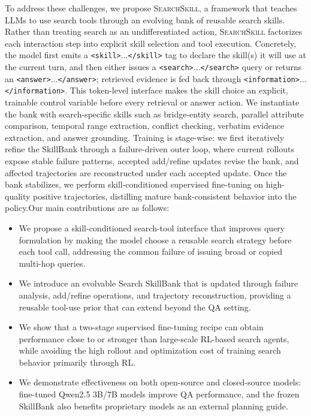\documentclass{article}
\newcommand{\Ours}{\textsc{SearchSkill}\xspace}
\newcommand{\tagopen}[2]{\texttt{\textcolor{#1}{<#2>}}}
\newcommand{\tagclose}[2]{\texttt{\textcolor{#1}{</#2>}}}
\begin{document}
To address these challenges, we propose \Ours, a framework that teaches LLMs to use search tools through an evolving bank of reusable search skills. Rather than treating search as an undifferentiated action, \Ours factorizes each interaction step into explicit skill selection and tool execution. Concretely, the model first emits a \tagopen{skilltagcolor}{skill}...\tagclose{skilltagcolor}{skill} tag to declare the skill(s) it will use at the current turn, and then either issues a \tagopen{searchtagcolor}{search}...\tagclose{searchtagcolor}{search} query or returns an \tagopen{answertagcolor}{answer}...\tagclose{answertagcolor}{answer}; retrieved evidence is fed back through \tagopen{infotagcolor}{information}...\tagclose{infotagcolor}{information}. This token-level interface makes the skill choice an explicit, trainable control variable before every retrieval or answer action. We instantiate the bank with search-specific skills such as bridge-entity search, parallel attribute comparison, temporal range extraction, conflict checking, verbatim evidence extraction, and answer grounding. Training is stage-wise: we first iteratively refine the SkillBank through a failure-driven outer loop, where current rollouts expose stable failure patterns, accepted add/refine updates revise the bank, and affected trajectories are reconstructed under each accepted update. Once the bank stabilizes, we perform skill-conditioned supervised fine-tuning on high-quality positive trajectories, distilling mature bank-consistent behavior into the policy.Our main contributions are as follows:
\begin{itemize}
  \item We propose a skill-conditioned search-tool interface that improves query formulation by making the model choose a reusable search strategy before each tool call, addressing the common failure of issuing broad or copied multi-hop queries.
  \item We introduce an evolvable Search SkillBank that is updated through failure analysis, add/refine operations, and trajectory reconstruction, providing a reusable tool-use prior that can extend beyond the QA setting.
  \item We show that a two-stage supervised fine-tuning recipe can obtain performance close to or stronger than large-scale RL-based search agents, while avoiding the high rollout and optimization cost of training search behavior primarily through RL.
  \item We demonstrate effectiveness on both open-source and closed-source models: fine-tuned Qwen2.5 3B/7B models improve QA performance, and the frozen SkillBank also benefits proprietary models as an external planning guide.
\end{itemize}
\end{document}
